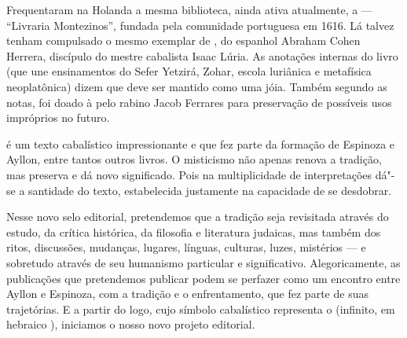 \begin{multicols}{2}
Frequentaram na Holanda a mesma biblioteca, ainda ativa atualmente, a {} --- ``Livraria Montezinos'', fundada pela comunidade portuguesa em 1616. Lá talvez tenham compulsado o mesmo exemplar de {}, do espanhol Abraham Cohen Herrera, discípulo do mestre cabalista Isaac Lúria. As anotações internas do livro (que une ensinamentos do Sefer Yetzirá, Zohar, escola luriânica e metafísica neoplatônica) dizem que deve ser mantido como uma jóia. Também segundo as notas, foi doado à {} pelo rabino Jacob Ferrares para preservação de possíveis usos impróprios no futuro.

{} é um texto cabalístico impressionante e que fez parte da formação de Espinoza e Ayllon, entre tantos outros livros. O misticismo não apenas renova a tradição, mas preserva e dá novo significado. Pois na multiplicidade de interpretações dá"-se a santidade do texto, estabelecida justamente na capacidade de se desdobrar.

Nesse novo selo editorial, pretendemos que a tradição seja revisitada através do estudo, da crítica histórica, da filosofia e literatura judaicas, mas também dos ritos, discussões, mudanças, lugares, línguas, culturas, luzes, mistérios --- e sobretudo através de seu humanismo particular e significativo. Alegoricamente, as publicações que pretendemos publicar podem se perfazer como um encontro entre Ayllon e Espinoza, com a tradição e o enfrentamento, que fez parte de suas trajetórias. E a partir do logo, cujo símbolo cabalístico representa o {} (infinito, em hebraico {}), iniciamos o nosso novo projeto editorial.

\bigskip

\noindent{}\textcolor{gray}{\footnotesize{}}
\end{multicols}

\pagebreak
